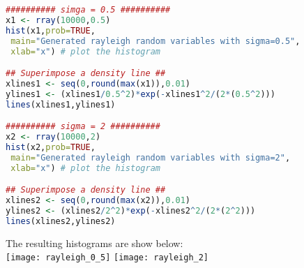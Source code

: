 \documentclass{amsart}
\theoremstyle{definition}
\theoremstyle{remark}
\begin{document}
\begin{enumerate}
\begin{lstlisting}[language=R]
########## simga = 0.5 ##########
x1 <- rray(10000,0.5)
hist(x1,prob=TRUE,
 main="Generated rayleigh random variables with sigma=0.5",
 xlab="x") # plot the histogram

## Superimpose a density line ##
xlines1 <- seq(0,round(max(x1)),0.01)
ylines1 <- (xlines1/0.5^2)*exp(-xlines1^2/(2*(0.5^2)))
lines(xlines1,ylines1)

########## sigma = 2 ##########
x2 <- rray(10000,2)
hist(x2,prob=TRUE,
 main="Generated rayleigh random variables with sigma=2",
 xlab="x") # plot the histogram

## Superimpose a density line ##
xlines2 <- seq(0,round(max(x2)),0.01)
ylines2 <- (xlines2/2^2)*exp(-xlines2^2/(2*(2^2)))
lines(xlines2,ylines2)
\end{lstlisting}
The resulting histograms are show below:\\
\texttt{[image: rayleigh\_0\_5]}
\texttt{[image: rayleigh\_2]}
\end{enumerate}
\end{document}
